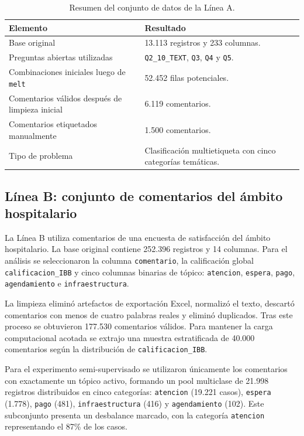\documentclass[12pt,a4paper]{article}
\newcommand{\code}[1]{\nolinkurl{#1}}
\begin{document}
\begin{table}[htbp]
\centering
\caption{Resumen del conjunto de datos de la Línea A.}
\label{tab:dataset_a_resumen}
\small
\begin{tabularx}{\textwidth}{@{}P{5.4cm}Y@{}}
\toprule
\textbf{Elemento} & \textbf{Resultado} \\
\midrule
Base original & 13.113 registros y 233 columnas. \\
Preguntas abiertas utilizadas & \code{Q2\_10\_TEXT}, \code{Q3}, \code{Q4} y \code{Q5}. \\
Combinaciones iniciales luego de \code{melt} & 52.452 filas potenciales. \\
Comentarios válidos después de limpieza inicial & 6.119 comentarios. \\
Comentarios etiquetados manualmente & 1.500 comentarios. \\
Tipo de problema & Clasificación multietiqueta con cinco categorías temáticas. \\
\bottomrule
\end{tabularx}
\end{table}
\FloatBarrier

\subsection{Línea B: conjunto de comentarios del ámbito hospitalario}

La Línea B utiliza comentarios de una encuesta de satisfacción del ámbito hospitalario. La base original contiene 252.396 registros y 14 columnas. Para el análisis se seleccionaron la columna \code{comentario}, la calificación global \code{calificacion\_IBB} y cinco columnas binarias de tópico: \code{atencion}, \code{espera}, \code{pago}, \code{agendamiento} e \code{infraestructura}.

La limpieza eliminó artefactos de exportación Excel, normalizó el texto, descartó comentarios con menos de cuatro palabras reales y eliminó duplicados. Tras este proceso se obtuvieron 177.530 comentarios válidos. Para mantener la carga computacional acotada se extrajo una muestra estratificada de 40.000 comentarios según la distribución de \code{calificacion\_IBB}.

Para el experimento semi-supervisado se utilizaron únicamente los comentarios con exactamente un tópico activo, formando un pool multiclase de 21.998 registros distribuidos en cinco categorías: \code{atencion} (19.221 casos), \code{espera} (1.778), \code{pago} (481), \code{infraestructura} (416) y \code{agendamiento} (102). Este subconjunto presenta un desbalance marcado, con la categoría \code{atencion} representando el 87\% de los casos.
\end{document}

